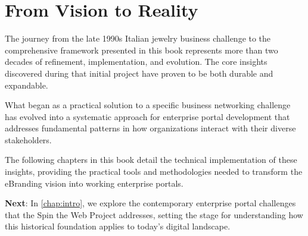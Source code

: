 \section{From Vision to Reality}

The journey from the late 1990s Italian jewelry business challenge to the comprehensive framework presented in this book represents more than two decades of refinement, implementation, and evolution. The core insights discovered during that initial project have proven to be both durable and expandable.

What began as a practical solution to a specific business networking challenge has evolved into a systematic approach for enterprise portal development that addresses fundamental patterns in how organizations interact with their diverse stakeholders.

The following chapters in this book detail the technical implementation of these insights, providing the practical tools and methodologies needed to transform the eBranding vision into working enterprise portals.

\textbf{Next}: In \cref{chap:intro}, we explore the contemporary enterprise portal challenges that the Spin the Web Project addresses, setting the stage for understanding how this historical foundation applies to today's digital landscape.
